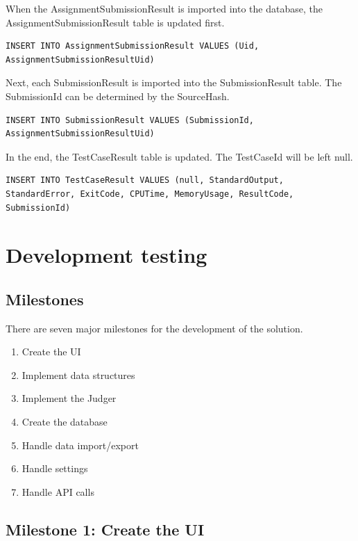 \documentclass[a4paper]{report}
\begin{document}
When the AssignmentSubmissionResult is imported into the database, the AssignmentSubmissionResult table is updated first.

\begin{verbatim}
INSERT INTO AssignmentSubmissionResult VALUES (Uid, AssignmentSubmissionResultUid)
\end{verbatim}

Next, each SubmissionResult is imported into the SubmissionResult table. The SubmissionId can be determined by the SourceHash.

\begin{verbatim}
INSERT INTO SubmissionResult VALUES (SubmissionId, AssignmentSubmissionResultUid)
\end{verbatim}

In the end, the TestCaseResult table is updated. The TestCaseId will be left null.

\begin{verbatim}
INSERT INTO TestCaseResult VALUES (null, StandardOutput, StandardError, ExitCode, CPUTime, MemoryUsage, ResultCode, SubmissionId)
\end{verbatim}

\section{Development testing}

\subsection{Milestones}

There are seven major milestones for the development of the solution.

\begin{enumerate}
    \item Create the UI
    \item Implement data structures
    \item Implement the Judger
    \item Create the database
    \item Handle data import/export
    \item Handle settings
    \item Handle API calls
\end{enumerate}

\subsection{Milestone 1: Create the UI}
\end{document}
